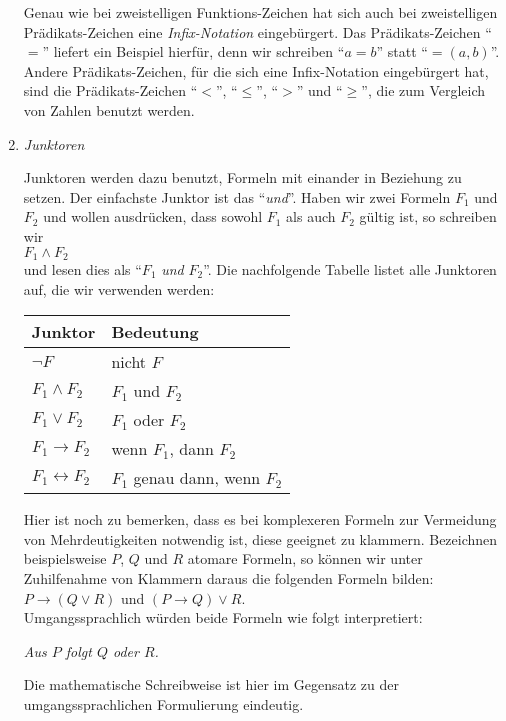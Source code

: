 \begin{enumerate}
      Genau wie bei zweistelligen  Funktions-Zeichen hat sich auch bei zweistelligen
      Pr\"adikats-Zeichen eine \emph{Infix-Notation} eingeb\"urgert.
      Das Pr\"adikats-Zeichen ``$=$'' liefert ein Beispiel hierf\"ur, denn wir schreiben
      ``$a=b$'' statt ``$=(a,b)$''.  Andere Pr\"adikats-Zeichen, f\"ur die sich eine
      Infix-Notation eingeb\"urgert hat, sind die Pr\"adikats-Zeichen ``$<$'', 
      ``$\leq$'', ``$>$'' und ``$\geq$'', die zum Vergleich von Zahlen benutzt werden. 
\item \emph{Junktoren} 

      Junktoren werden dazu benutzt, Formeln mit einander in Beziehung zu setzen.  Der einfachste Junktor
      ist das ``\emph{und}''. Haben wir zwei Formeln $F_1$ und $F_2$ und wollen ausdr\"ucken, dass sowohl
      $F_1$ als auch $F_2$ g\"ultig ist, so schreiben wir \\[0.2cm]
      \hspace*{1.3cm} $F_1 \wedge F_2$ \\[0.2cm]
      und lesen dies als ``$F_1$ \emph{und} $F_2$''.  Die nachfolgende Tabelle listet alle
      Junktoren auf, die wir verwenden werden: \\[0.2cm]
      \hspace*{1.3cm} 
      \begin{tabular}{|l|l|}
      \hline
      Junktor & Bedeutung \\
      \hline
      \hline
        $\neg F$ & nicht $F$ \\
      \hline
        $F_1 \wedge F_2$ & $F_1$ und $F_2$ \\
      \hline
        $F_1 \vee F_2$ & $F_1$ oder $F_2$ \\
      \hline
        $F_1 \rightarrow F_2$ & wenn $F_1$, dann $F_2$ \\
      \hline
        $F_1 \leftrightarrow F_2$ &  $F_1$ genau dann, wenn $F_2$ \\
      \hline
      \end{tabular}

      Hier ist noch zu bemerken, dass es bei komplexeren Formeln zur Vermeidung von Mehrdeutigkeiten
      notwendig ist, diese geeignet zu klammern.  Bezeichnen beispielsweise
      $P$, $Q$ und $R$ atomare Formeln,
      so k\"onnen wir unter Zuhilfenahme von Klammern daraus  die folgenden Formeln bilden: \\[0.2cm]
      \hspace*{1.3cm}  $P \rightarrow (Q \vee R)$ \quad und \quad $(P \rightarrow Q) \vee R$. \\[0.2cm]
      Umgangssprachlich w\"urden beide Formeln wie folgt interpretiert: 
      \begin{center}
      \begin{minipage}{12cm}
        \textsl{Aus $P$ folgt $Q$ oder $R$.}
      \end{minipage}
      \end{center}
      Die mathematische Schreibweise ist hier im Gegensatz zu der umgangssprachlichen Formulierung
      eindeutig.


\end{enumerate}
